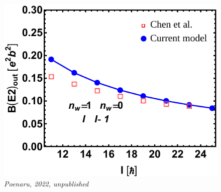 \documentclass{beamer}
\begin{document}
\begin{frame}
\begin{figure}
    \includegraphics[scale=0.4]{Figs/ba130-EM.pdf}
    \tiny{\emph{Poenaru, 2022, unpublished}}
  \end{figure}
\end{frame}
\end{document}
